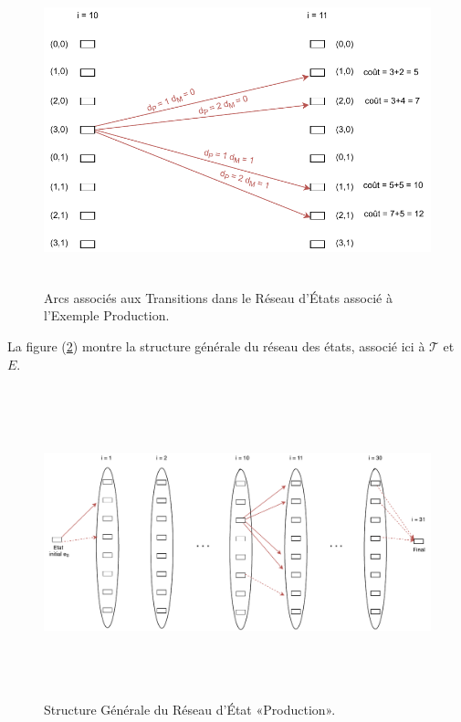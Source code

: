 \begin{figure}[H]
	\centerline{
		\includegraphics[height=9cm]{images_these/Arcs_associe.pdf}}
	\caption[Arcs associés aux Transitions]{Arcs associés aux Transitions dans le Réseau d'États associé à l'Exemple Production. }
	\label{Arcs_associe}
\end{figure}

La figure (\ref{Structure_G}) montre la structure générale du réseau des états, associé ici à $\mathcal{T}$ et $E$.
\begin{figure}[H]
	\centerline{
		\includegraphics[height=9cm]{images_these/Structure_G.pdf}}
	\caption[Structure Générale du Réseau d'État "Production" ]{Structure Générale du Réseau d'État «Production».}
	\label{Structure_G}
\end{figure}

